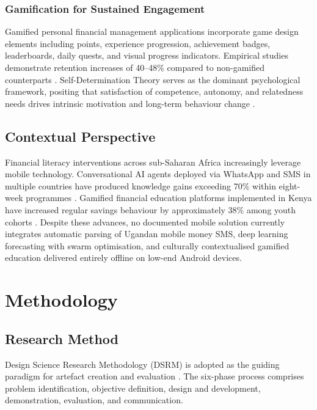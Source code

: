 \documentclass[12pt]{article}
\begin{document}
\subsubsection{\large Gamification for Sustained Engagement}
Gamified personal financial management applications incorporate game design elements including points, experience progression, achievement badges, leaderboards, daily quests, and visual progress indicators. Empirical studies demonstrate retention increases of 40–48\% compared to non-gamified counterparts \citep{bitrian2021}. Self-Determination Theory serves as the dominant psychological framework, positing that satisfaction of competence, autonomy, and relatedness needs drives intrinsic motivation and long-term behaviour change \citep{uppaluri2025,khaldi2023}.

\subsection{\large Contextual Perspective}
Financial literacy interventions across sub-Saharan Africa increasingly leverage mobile technology. Conversational AI agents deployed via WhatsApp and SMS in multiple countries have produced knowledge gains exceeding 70\% within eight-week programmes \citep{mursi2024}. Gamified financial education platforms implemented in Kenya have increased regular savings behaviour by approximately 38\% among youth cohorts \citep{amana2024}. Despite these advances, no documented mobile solution currently integrates automatic parsing of Ugandan mobile money SMS, deep learning forecasting with swarm optimisation, and culturally contextualised gamified education delivered entirely offline on low-end Android devices.

\section{\huge \textbf{Methodology}}
\subsection{\large Research Method}
Design Science Research Methodology (DSRM) is adopted as the guiding paradigm for artefact creation and evaluation \citep{peffers2007}. The six-phase process comprises problem identification, objective definition, design and development, demonstration, evaluation, and communication.
\end{document}
